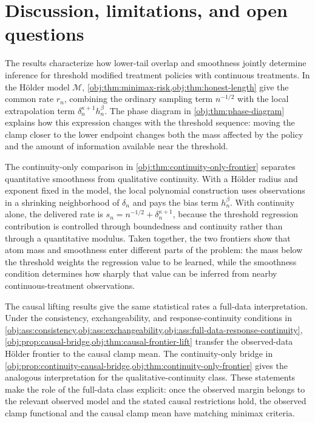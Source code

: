 \section{Discussion, limitations, and open questions}
\label{sec:discussion-open-questions}

The results characterize how lower-tail overlap and smoothness jointly determine inference for threshold modified treatment policies with continuous treatments. In the Hölder model \(\mathcal M\), \cref{obj:thm:minimax-risk,obj:thm:honest-length} give the common rate \(r_n\), combining the ordinary sampling term \(n^{-1/2}\) with the local extrapolation term \(\delta_n^{\kappa+1}h_n^\beta\). The phase diagram in \cref{obj:thm:phase-diagram} explains how this expression changes with the threshold sequence: moving the clamp closer to the lower endpoint changes both the mass affected by the policy and the amount of information available near the threshold.

The continuity-only comparison in \cref{obj:thm:continuity-only-frontier} separates quantitative smoothness from qualitative continuity. With a Hölder radius and exponent fixed in the model, the local polynomial construction uses observations in a shrinking neighborhood of \(\delta_n\) and pays the bias term \(h_n^\beta\). With continuity alone, the delivered rate is \(s_n=n^{-1/2}+\delta_n^{\kappa+1}\), because the threshold regression contribution is controlled through boundedness and continuity rather than through a quantitative modulus. Taken together, the two frontiers show that atom mass and smoothness enter different parts of the problem: the mass below the threshold weights the regression value to be learned, while the smoothness condition determines how sharply that value can be inferred from nearby continuous-treatment observations.

The causal lifting results give the same statistical rates a full-data interpretation. Under the consistency, exchangeability, and response-continuity conditions in \cref{obj:ass:consistency,obj:ass:exchangeability,obj:ass:full-data-response-continuity}, \cref{obj:prop:causal-bridge,obj:thm:causal-frontier-lift} transfer the observed-data Hölder frontier to the causal clamp mean. The continuity-only bridge in \cref{obj:prop:continuity-causal-bridge,obj:thm:continuity-only-frontier} gives the analogous interpretation for the qualitative-continuity class. These statements make the role of the full-data class explicit: once the observed margin belongs to the relevant observed model and the stated causal restrictions hold, the observed clamp functional and the causal clamp mean have matching minimax criteria.

